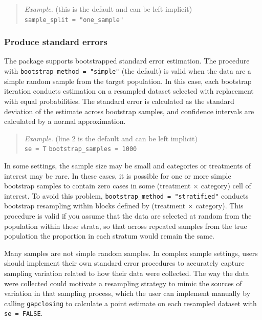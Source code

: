 \documentclass[
]{article}
\begin{document}
\begin{quote}
\emph{Example.} (this is the default and can be left implicit)\\
\texttt{sample\_split\ =\ "one\_sample"}
\end{quote}

\hypertarget{produce-standard-errors}{%
\subsubsection{Produce standard errors}\label{produce-standard-errors}}

The package supports bootstrapped standard error estimation. The procedure with \texttt{bootstrap\_method\ =\ "simple"} (the default) is valid when the data are a simple random sample from the target population. In this case, each bootstrap iteration conducts estimation on a resampled dataset selected with replacement with equal probabilities. The standard error is calculated as the standard deviation of the estimate across bootstrap samples, and confidence intervals are calculated by a normal approximation.

\begin{quote}
\emph{Example.} (line 2 is the default and can be left implicit)\\
\texttt{se\ =\ T}
\texttt{bootstrap\_samples\ =\ 1000}
\end{quote}

In some settings, the sample size may be small and categories or treatments of interest may be rare. In these cases, it is possible for one or more simple bootstrap samples to contain zero cases in some (treatment \(\times\) category) cell of interest. To avoid this problem, \texttt{bootstrap\_method\ =\ "stratified"} conducts bootstrap resampling within blocks defined by (treatment \(\times\) category). This procedure is valid if you assume that the data are selected at random from the population within these strata, so that across repeated samples from the true population the proportion in each stratum would remain the same.

Many samples are not simple random samples. In complex sample settings, users should implement their own standard error procedures to accurately capture sampling variation related to how their data were collected. The way the data were collected could motivate a resampling strategy to mimic the sources of variation in that sampling process, which the user can implement manually by calling \texttt{gapclosing} to calculate a point estimate on each resampled dataset with \texttt{se\ =\ FALSE}.
\end{document}
